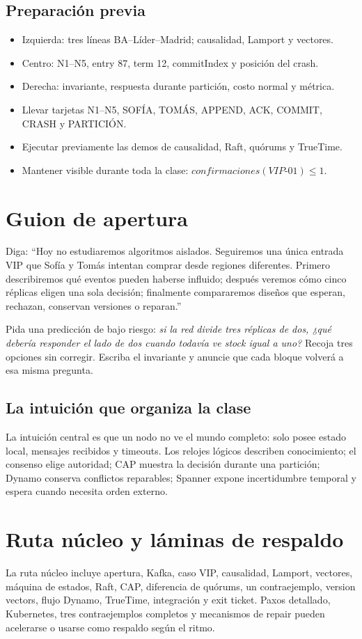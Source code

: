 \documentclass[variant=docente,cover=institutional,mode=screen]{ua-engineering-v6-article}
\begin{document}
\subsection{Preparación previa}
\begin{itemize}
\item Izquierda: tres líneas BA--Líder--Madrid; causalidad, Lamport y vectores.
\item Centro: N1--N5, entry 87, term 12, commitIndex y posición del crash.
\item Derecha: invariante, respuesta durante partición, costo normal y métrica.
\item Llevar tarjetas N1--N5, SOFÍA, TOMÁS, APPEND, ACK, COMMIT, CRASH y PARTICIÓN.
\item Ejecutar previamente las demos de causalidad, Raft, quórums y TrueTime.
\item Mantener visible durante toda la clase: \(confirmaciones(VIP\mbox{-}01)\le 1\).
\end{itemize}

\section{Guion de apertura}
Diga: ``Hoy no estudiaremos algoritmos aislados. Seguiremos una única entrada VIP que Sofía y Tomás intentan comprar desde regiones diferentes. Primero describiremos qué eventos pueden haberse influido; después veremos cómo cinco réplicas eligen una sola decisión; finalmente compararemos diseños que esperan, rechazan, conservan versiones o reparan.''

Pida una predicción de bajo riesgo: \emph{si la red divide tres réplicas de dos, ¿qué debería responder el lado de dos cuando todavía ve stock igual a uno?} Recoja tres opciones sin corregir. Escriba el invariante y anuncie que cada bloque volverá a esa misma pregunta.

\subsection{La intuición que organiza la clase}
La intuición central es que un nodo no ve el mundo completo: solo posee estado local, mensajes recibidos y timeouts. Los relojes lógicos describen conocimiento; el consenso elige autoridad; CAP muestra la decisión durante una partición; Dynamo conserva conflictos reparables; Spanner expone incertidumbre temporal y espera cuando necesita orden externo.

\section{Ruta núcleo y láminas de respaldo}
La ruta núcleo incluye apertura, Kafka, caso VIP, causalidad, Lamport, vectores, máquina de estados, Raft, CAP, diferencia de quórums, un contraejemplo, version vectors, flujo Dynamo, TrueTime, integración y exit ticket. Paxos detallado, Kubernetes, tres contraejemplos completos y mecanismos de repair pueden acelerarse o usarse como respaldo según el ritmo.
\end{document}
